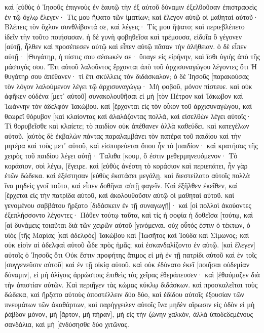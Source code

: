 καὶ [εὐθὺς ὁ Ἰησοῦς ἐπιγνοὺς ἐν ἑαυτῷ τὴν ἐξ αὐτοῦ δύναμιν ἐξελθοῦσαν ἐπιστραφεὶς ἐν τῷ ὄχλῳ ἔλεγεν· Τίς μου ἥψατο τῶν ἱματίων; 
καὶ ἔλεγον αὐτῷ οἱ μαθηταὶ αὐτοῦ· Βλέπεις τὸν ὄχλον συνθλίβοντά σε, καὶ λέγεις· Τίς μου ἥψατο; 
καὶ περιεβλέπετο ἰδεῖν τὴν τοῦτο ποιήσασαν. 
ἡ δὲ γυνὴ φοβηθεῖσα καὶ τρέμουσα, εἰδυῖα ὃ γέγονεν [αὐτῇ, ἦλθεν καὶ προσέπεσεν αὐτῷ καὶ εἶπεν αὐτῷ πᾶσαν τὴν ἀλήθειαν. 
ὁ δὲ εἶπεν αὐτῇ· [Θυγάτηρ, ἡ πίστις σου σέσωκέν σε· ὕπαγε εἰς εἰρήνην, καὶ ἴσθι ὑγιὴς ἀπὸ τῆς μάστιγός σου. 
Ἔτι αὐτοῦ λαλοῦντος ἔρχονται ἀπὸ τοῦ ἀρχισυναγώγου λέγοντες ὅτι Ἡ θυγάτηρ σου ἀπέθανεν· τί ἔτι σκύλλεις τὸν διδάσκαλον; 
ὁ δὲ Ἰησοῦς [παρακούσας τὸν λόγον λαλούμενον λέγει τῷ ἀρχισυναγώγῳ· Μὴ φοβοῦ, μόνον πίστευε. 
καὶ οὐκ ἀφῆκεν οὐδένα [μετ᾽ αὐτοῦ] συνακολουθῆσαι εἰ μὴ [τὸν Πέτρον καὶ Ἰάκωβον καὶ Ἰωάννην τὸν ἀδελφὸν Ἰακώβου. 
καὶ [ἔρχονται εἰς τὸν οἶκον τοῦ ἀρχισυναγώγου, καὶ θεωρεῖ θόρυβον [καὶ κλαίοντας καὶ ἀλαλάζοντας πολλά, 
καὶ εἰσελθὼν λέγει αὐτοῖς· Τί θορυβεῖσθε καὶ κλαίετε; τὸ παιδίον οὐκ ἀπέθανεν ἀλλὰ καθεύδει. 
καὶ κατεγέλων αὐτοῦ. [αὐτὸς δὲ ἐκβαλὼν πάντας παραλαμβάνει τὸν πατέρα τοῦ παιδίου καὶ τὴν μητέρα καὶ τοὺς μετ᾽ αὐτοῦ, καὶ εἰσπορεύεται ὅπου ἦν τὸ [παιδίον· 
καὶ κρατήσας τῆς χειρὸς τοῦ παιδίου λέγει αὐτῇ· Ταλιθα [κουμ, ὅ ἐστιν μεθερμηνευόμενον· Τὸ κοράσιον, σοὶ λέγω, [ἔγειρε. 
καὶ [εὐθὺς ἀνέστη τὸ κοράσιον καὶ περιεπάτει, ἦν γὰρ ἐτῶν δώδεκα. καὶ ἐξέστησαν [εὐθὺς ἐκστάσει μεγάλῃ. 
καὶ διεστείλατο αὐτοῖς πολλὰ ἵνα μηδεὶς γνοῖ τοῦτο, καὶ εἶπεν δοθῆναι αὐτῇ φαγεῖν. 
Καὶ ἐξῆλθεν ἐκεῖθεν, καὶ [ἔρχεται εἰς τὴν πατρίδα αὐτοῦ, καὶ ἀκολουθοῦσιν αὐτῷ οἱ μαθηταὶ αὐτοῦ. 
καὶ γενομένου σαββάτου ἤρξατο [διδάσκειν ἐν τῇ συναγωγῇ]· καὶ [οἱ πολλοὶ ἀκούοντες ἐξεπλήσσοντο λέγοντες· Πόθεν τούτῳ ταῦτα, καὶ τίς ἡ σοφία ἡ δοθεῖσα [τούτῳ, καὶ [αἱ δυνάμεις τοιαῦται διὰ τῶν χειρῶν αὐτοῦ [γινόμεναι. 
οὐχ οὗτός ἐστιν ὁ τέκτων, ὁ υἱὸς [τῆς Μαρίας [καὶ ἀδελφὸς] Ἰακώβου καὶ [Ἰωσῆτος καὶ Ἰούδα καὶ Σίμωνος; καὶ οὐκ εἰσὶν αἱ ἀδελφαὶ αὐτοῦ ὧδε πρὸς ἡμᾶς; καὶ ἐσκανδαλίζοντο ἐν αὐτῷ. 
[καὶ ἔλεγεν] αὐτοῖς ὁ Ἰησοῦς ὅτι Οὐκ ἔστιν προφήτης ἄτιμος εἰ μὴ ἐν τῇ πατρίδι αὐτοῦ καὶ ἐν τοῖς [συγγενεῦσιν αὐτοῦ] καὶ ἐν τῇ οἰκίᾳ αὐτοῦ. 
καὶ οὐκ ἐδύνατο ἐκεῖ [ποιῆσαι οὐδεμίαν δύναμιν], εἰ μὴ ὀλίγοις ἀρρώστοις ἐπιθεὶς τὰς χεῖρας ἐθεράπευσεν· 
καὶ [ἐθαύμαζεν διὰ τὴν ἀπιστίαν αὐτῶν. Καὶ περιῆγεν τὰς κώμας κύκλῳ διδάσκων. 
καὶ προσκαλεῖται τοὺς δώδεκα, καὶ ἤρξατο αὐτοὺς ἀποστέλλειν δύο δύο, καὶ ἐδίδου αὐτοῖς ἐξουσίαν τῶν πνευμάτων τῶν ἀκαθάρτων, 
καὶ παρήγγειλεν αὐτοῖς ἵνα μηδὲν αἴρωσιν εἰς ὁδὸν εἰ μὴ ῥάβδον μόνον, μὴ [ἄρτον, μὴ πήραν], μὴ εἰς τὴν ζώνην χαλκόν, 
ἀλλὰ ὑποδεδεμένους σανδάλια, καὶ μὴ [ἐνδύσησθε δύο χιτῶνας. 
